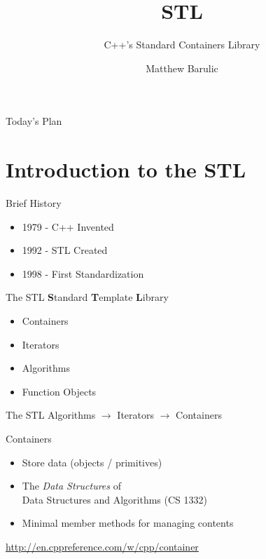 \documentclass{beamer}
\author{Matthew Barulic}
\title{STL}
\subtitle{C++'s Standard Containers Library}
\institute{
RoboJackets\\
Spring Training Series\\
Georgia Tech
}
\begin{document}
\begin{frame}
	\titlepage
\end{frame}

\begin{frame}{Today's Plan}

\tableofcontents
	
\end{frame}

\section{Introduction to the STL}

\begin{frame}{Brief History}
	\begin{itemize}
		\item 1979 - C++ Invented
		\item 1992 - STL Created
		\item 1998 - First Standardization
	\end{itemize}
\end{frame}

\begin{frame}{The STL}
	\textbf{S}tandard \textbf{T}emplate \textbf{L}ibrary
	\begin{itemize}
		\item Containers
		\item Iterators
		\item Algorithms
		\item Function Objects
	\end{itemize}
\end{frame}

\begin{frame}{The STL}
	Algorithms $\rightarrow$ Iterators $\rightarrow$ Containers
\end{frame}

\begin{frame}{Containers}
	\begin{itemize}
		\item Store data (objects / primitives)
		\item The \textit{Data Structures} of \\Data Structures and Algorithms (CS 1332)
		\item Minimal member methods for managing contents
	\end{itemize}

	\bigskip

	\begin{center}
		\url{http://en.cppreference.com/w/cpp/container}
	\end{center}
\end{frame}
\end{document}
